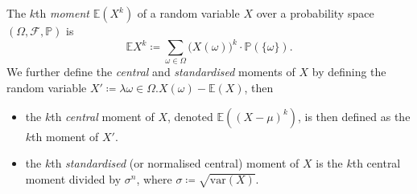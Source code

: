 		\begin{definition}[Moments]
			The $k$th \emph{moment} $\mathbb{E}(X^k)$ of a random variable $X$ over a probability space 
			$(\Omega, \mathcal{F}, \mathbb{P})$ is 
			$$
				\mathbb{E}{X^k} \coloneqq \sum_{\omega \in \Omega} \big(X(\omega)\big)^k \cdot \mathbb{P}(\{\omega\}).
			$$
			We further define the \emph{central} and \emph{standardised} moments of $X$ by defining the random variable 
			$X' \coloneqq \lambda \omega \in \Omega. X(\omega) - \mathbb{E}(X)$, then 
			\begin{itemize}
				\item the $k$th \emph{central} moment of $X$, denoted $\mathbb{E}((X-\mu)^k)$, is then defined as the 
				$k$th moment of $X'$. 
				\item the $k$th \emph{standardised} (or normalised central) moment of $X$ is the $k$th central moment 
				divided by $\sigma^n$, where $\sigma \coloneqq \sqrt{\mathrm{var}(X)}$.
			\end{itemize}
		\end{definition}


